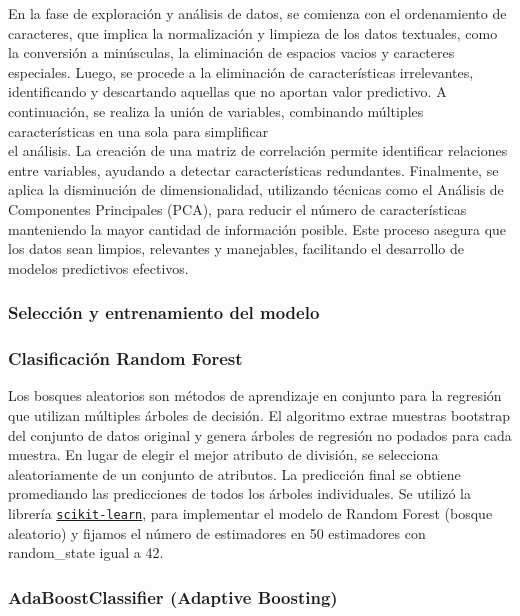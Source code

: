 \documentclass[
  number,
  preprint,
  3p,
  twocolumn]{elsarticle}
\begin{document}
En la fase de exploración y análisis de datos, se comienza con el
ordenamiento de caracteres, que implica la normalización y limpieza de
los datos textuales, como la conversión a minúsculas, la eliminación de
espacios vacios y caracteres especiales. Luego, se procede a la
eliminación de características irrelevantes, identificando y descartando
aquellas que no aportan valor predictivo. A continuación, se realiza la
unión de variables, combinando múltiples características en una sola
para simplificar\\
el análisis. La creación de una matriz de correlación permite
identificar relaciones entre variables, ayudando a detectar
características redundantes. Finalmente, se aplica la disminución de
dimensionalidad, utilizando técnicas como el Análisis de Componentes
Principales (PCA), para reducir el número de características manteniendo
la mayor cantidad de información posible. Este proceso asegura que los
datos sean limpios, relevantes y manejables, facilitando el desarrollo
de modelos predictivos efectivos.

\subsubsection{Selección y entrenamiento del
modelo}\label{selecciuxf3n-y-entrenamiento-del-modelo}

\subsubsection{Clasificación Random
Forest}\label{clasificaciuxf3n-random-forest}

Los bosques aleatorios son métodos de aprendizaje en conjunto para la
regresión que utilizan múltiples árboles de decisión. El algoritmo
extrae muestras bootstrap del conjunto de datos original y genera
árboles de regresión no podados para cada muestra. En lugar de elegir el
mejor atributo de división, se selecciona aleatoriamente de un conjunto
de atributos. La predicción final se obtiene promediando las
predicciones de todos los árboles individuales. Se utilizó la librería
\href{https://scikit-learn.org/stable/modules/generated/sklearn.ensemble.RandomForestClassifier.html}{\texttt{scikit-learn}},
para implementar el modelo de Random Forest (bosque aleatorio) y fijamos
el número de estimadores en 50 estimadores con random\_state igual a 42.

\subsubsection{AdaBoostClassifier (Adaptive
Boosting)}\label{adaboostclassifier-adaptive-boosting}
\end{document}
